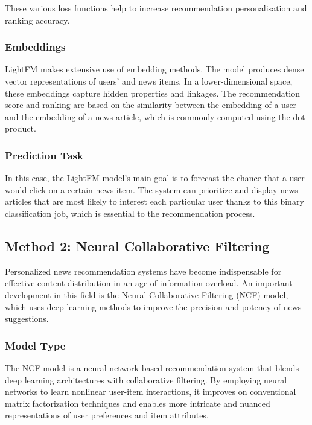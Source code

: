 \documentclass[9pt,twocolumn,twoside,lineno]{gsajnl}
\begin{document}
These various loss functions help to increase recommendation personalisation and ranking accuracy.

\subsubsection{Embeddings\newline}
LightFM makes extensive use of embedding methods.  The model produces dense vector representations of users' and news items.  In a lower-dimensional space, these embeddings capture hidden properties and linkages.  The recommendation score and ranking are based on the similarity between the embedding of a user and the embedding of a news article, which is commonly computed using the dot product.

\subsubsection{Prediction Task\newline}
In this case, the LightFM model's main goal is to forecast the chance that a user would click on a certain news item.  The system can prioritize and display news articles that are most likely to interest each particular user thanks to this binary classification job, which is essential to the recommendation process.

\subsection{Method 2: Neural Collaborative Filtering}
Personalized news recommendation systems have become indispensable for effective content distribution in an age of information overload. An important development in this field is the Neural Collaborative Filtering (NCF) model, which uses deep learning methods to improve the precision and potency of news suggestions.

\subsubsection{Model Type\newline}
The NCF model is a neural network-based recommendation system that blends deep learning architectures with collaborative filtering. By employing neural networks to learn nonlinear user-item interactions, it improves on conventional matrix factorization techniques and enables more intricate and nuanced representations of user preferences and item attributes.
\end{document}
